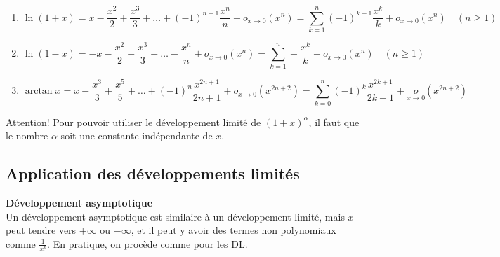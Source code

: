\begin{small}
\begin{Prop}
\begin{enumerate}
\noindent \textbf{Intégration terme à terme :}\\
\item
\[
\ln(1 + x) = x - \frac{x^2}{2} + \frac{x^3}{3} + \ldots + (-1)^{n-1} \frac{x^n}{n} + o_{x \to 0}(x^n) = \sum_{k=1}^{n} (-1)^{k-1} \frac{x^k}{k} + o_{x \to 0}(x^n) \quad (n \ge 1)
\]
\item
\[
\ln(1 - x) = -x - \frac{x^2}{2} - \frac{x^3}{3} - \ldots - \frac{x^n}{n} + o_{x \to 0}(x^n) = \sum_{k=1}^{n} -\frac{x^k}{k} + o_{x \to 0}(x^n) \quad (n \ge 1)
\]


\item
\[
\arctan x = x - \frac{x^3}{3} + \frac{x^5}{5} + \ldots + (-1)^n \frac{x^{2n+1}}{2n+1} + o_{x \to 0}(x^{2n+2}) = \sum_{k=0}^{n} (-1)^k \frac{x^{2k+1}}{2k+1} +  \underset{x \to 0}{o}(x^{2n+2})
\]

\end{enumerate}
\end{Prop}

\end{small}


%
%
%
\begin{Rem}
Attention! Pour pouvoir utiliser le développement limité de $(1+x)^\alpha$, il faut que le nombre $\alpha$ soit
une constante indépendante de $x$.
\end{Rem}





\subsection{Application des développements limités}

\begin{Def}\textbf{Développement asymptotique}\\

Un développement asymptotique est similaire à un développement limité, mais \(x\) peut tendre vers \(+\infty\) ou \(-\infty\), et il peut y avoir des termes non polynomiaux comme \(\frac{1}{x^p}\). En pratique, on procède comme pour les DL.\\
\end{Def}


